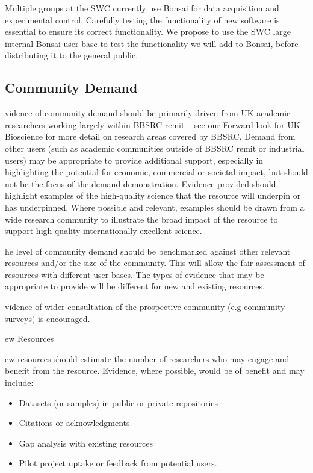 \documentclass[a4paper,11point]{article}
\def\ii#1\par{{\color{blue!40}\sl #1}\par}
\def\iibf#1\par{{\color{blue!40}\sl\bfseries #1}\par}
\begin{document}
Multiple groups at the SWC currently use Bonsai for data acquisition and
experimental control. Carefully testing the functionality of new software is
essential to ensure its correct functionality. We propose to use the SWC large
internal Bonsai user base to test the functionality we will add to Bonsai,
before distributing it to the general public.

\subsection{Community Demand}
\ii Evidence of community demand should be primarily driven from UK 
academic researchers working largely within BBSRC remit – see our 
Forward look for UK Bioscience for more detail on research areas covered by 
BBSRC. Demand from other users (such as academic communities outside 
of BBSRC remit or industrial users) may be appropriate to provide additional 
support, especially in highlighting the potential for economic, commercial or 
societal impact, but should not be the focus of the demand demonstration. 
Evidence provided should highlight examples of the high-quality science that 
the resource will underpin or has underpinned. Where possible and relevant, 
examples should be drawn from a wide research community to illustrate the 
broad impact of the resource to support high-quality internationally excellent 
science.  

\ii The level of community demand should be benchmarked against other 
relevant resources and/or the size of the community. This will allow the fair 
assessment of resources with different user bases. The types of evidence 
that may be appropriate to provide will be different for new and existing 
resources. 

\ii Evidence of wider consultation of the prospective community (e.g community 
surveys) is encouraged. 

\iibf New Resources

\ii New resources should estimate the number of researchers who may engage and benefit from the resource. Evidence, where possible, would be of benefit and may include: 
\begin{itemize}
    \item  Datasets (or samples) in public or private repositories 
    \item Citations or acknowledgments 
    \item Gap analysis with existing resources 
    \item Pilot project uptake or feedback from potential users.  
\end{itemize}
\end{document}
